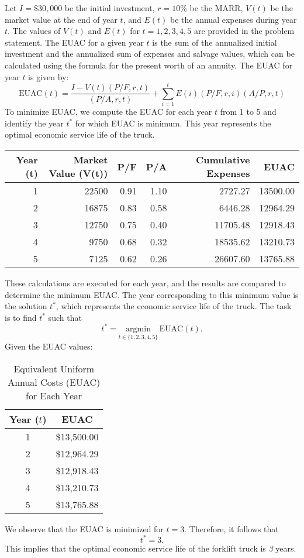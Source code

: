 \documentclass[12pt]{article}
\begin{document}
Let \( I = \$30,000 \) be the initial investment, \( r = 10\% \) be the MARR, \( V(t) \) be the market value at the end of year \( t \), and \( E(t) \) be the annual expenses during year \( t \). The values of \( V(t) \) and \( E(t) \) for \( t = 1, 2, 3, 4, 5 \) are provided in the problem statement. The EUAC for a given year \( t \) is the sum of the annualized initial investment and the annualized sum of expenses and salvage values, which can be calculated using the formula for the present worth of an annuity. The EUAC for year \( t \) is given by: \[ \text{EUAC}(t) = \frac{I - V(t)(P/F, r, t)}{(P/A, r, t)} + \sum_{i=1}^{t} E(i)(P/F, r, i)(A/P, r, t) \] To minimize EUAC, we compute the EUAC for each year \( t \) from 1 to 5 and identify the year \( t^* \) for which EUAC is minimum. This year represents the optimal economic service life of the truck. \begin{center} \begin{tabular}{rrrrrr} \toprule Year (t) & Market Value (V(t)) & P/F & P/A & Cumulative Expenses & EUAC \\ \midrule 1 & 22500 & 0.91 & 1.10 & 2727.27 & 13500.00 \\ 2 & 16875 & 0.83 & 0.58 & 6446.28 & 12964.29 \\ 3 & 12750 & 0.75 & 0.40 & 11705.48 & 12918.43 \\ 4 & 9750 & 0.68 & 0.32 & 18535.62 & 13210.73 \\ 5 & 7125 & 0.62 & 0.26 & 26607.60 & 13765.88 \\ \bottomrule \end{tabular} \end{center} These calculations are executed for each year, and the results are compared to determine the minimum EUAC. The year corresponding to this minimum value is the solution \( t^* \), which represents the economic service life of the truck. The task is to find \( t^* \) such that \[ t^* = \underset{t \in \{1, 2, 3, 4, 5\}}{\mathrm{argmin}} \, \text{EUAC}(t). \] Given the EUAC values: 

\begin{table}[h] \centering \begin{tabular}{|c|c|} \hline \textbf{Year} (\(t\)) & \textbf{EUAC} \\ \hline 1 & \$13,500.00 \\ 2 & \$12,964.29 \\ 3 & \$12,918.43 \\ 4 & \$13,210.73 \\ 5 & \$13,765.88 \\ \hline \end{tabular} \caption{Equivalent Uniform Annual Costs (EUAC) for Each Year} \label{tab:euac_values} \end{table} We observe that the EUAC is minimized for \( t = 3 \). Therefore, it follows that \[ \boxed{t^* = 3}. \] This implies that the optimal economic service life of the forklift truck is \textit{3} years.
\end{document}
